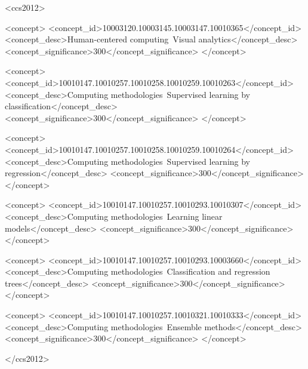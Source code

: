 \documentclass[sigconf, review]{acmart}
\begin{document}
%
%
\begin{CCSXML}
	<ccs2012>

		<concept>
			<concept_id>10003120.10003145.10003147.10010365</concept_id>
			<concept_desc>Human-centered computing~Visual analytics</concept_desc>
			<concept_significance>300</concept_significance>
		</concept>		

		<concept>
			<concept_id>10010147.10010257.10010258.10010259.10010263</concept_id>
			<concept_desc>Computing methodologies~Supervised learning by classification</concept_desc>
			<concept_significance>300</concept_significance>
		</concept>

		<concept>
			<concept_id>10010147.10010257.10010258.10010259.10010264</concept_id>
			<concept_desc>Computing methodologies~Supervised learning by regression</concept_desc>
			<concept_significance>300</concept_significance>
		</concept>
		
		<concept>
			<concept_id>10010147.10010257.10010293.10010307</concept_id>
			<concept_desc>Computing methodologies~Learning linear models</concept_desc>
			<concept_significance>300</concept_significance>
		</concept>
		
		<concept>
			<concept_id>10010147.10010257.10010293.10003660</concept_id>
			<concept_desc>Computing methodologies~Classification and regression trees</concept_desc>
			<concept_significance>300</concept_significance>
		</concept>

		<concept>
			<concept_id>10010147.10010257.10010321.10010333</concept_id>
			<concept_desc>Computing methodologies~Ensemble methods</concept_desc>
			<concept_significance>300</concept_significance>
		</concept>		
				
	</ccs2012>
\end{CCSXML}


%
\end{document}
